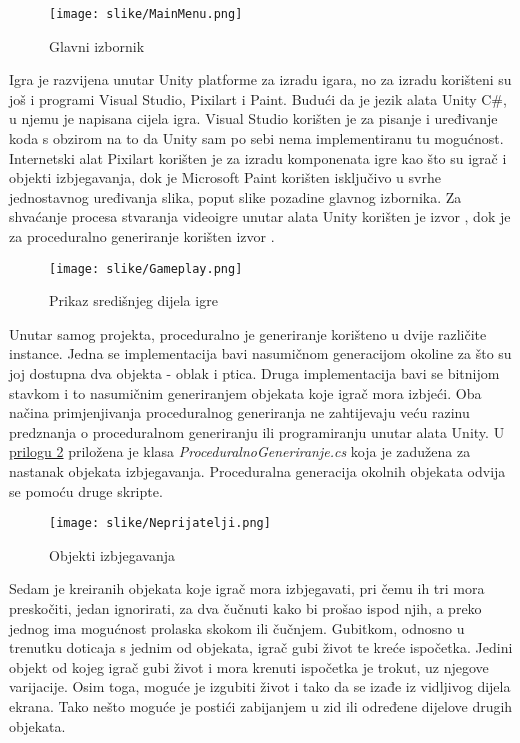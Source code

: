 \documentclass[]{foi} %
\begin{document}
\begin{figure}[H]
    \centering
    \texttt{[image: slike/MainMenu.png]}
    \caption{Glavni izbornik}
\end{figure}

Igra je razvijena unutar Unity platforme za izradu igara, no za izradu korišteni su još i programi Visual Studio, Pixilart i Paint. Budući da je jezik alata Unity C\#, u njemu je napisana cijela igra. Visual Studio korišten je za pisanje i uređivanje koda s obzirom na to da Unity sam po sebi nema implementiranu tu mogućnost. Internetski alat Pixilart korišten je za izradu komponenata igre kao što su igrač i objekti izbjegavanja, dok je Microsoft Paint korišten isključivo u svrhe jednostavnog uređivanja slika, poput slike pozadine glavnog izbornika. Za shvaćanje procesa stvaranja videoigre unutar alata Unity korišten je izvor \cite{youtube2dPlatformer}, dok je za proceduralno generiranje korišten izvor \cite{youtubeProceduralno}.

\begin{figure}[H]
    \centering
    \texttt{[image: slike/Gameplay.png]}
    \caption{Prikaz središnjeg dijela igre}
\end{figure}

Unutar samog projekta, proceduralno je generiranje korišteno u dvije različite instance. Jedna se implementacija bavi nasumičnom generacijom okoline za što su joj dostupna dva objekta - oblak i ptica. Druga implementacija bavi se bitnijom stavkom i to nasumičnim generiranjem objekata koje igrač mora izbjeći. Oba načina primjenjivanja proceduralnog generiranja ne zahtijevaju veću razinu predznanja o proceduralnom generiranju ili programiranju unutar alata Unity. U \hyperref[cha: prilog 2]{prilogu 2} priložena je klasa \textit{ProceduralnoGeneriranje.cs} koja je zadužena za nastanak objekata izbjegavanja. Proceduralna generacija okolnih objekata odvija se pomoću druge skripte.

\begin{figure}[H]
    \centering
    \texttt{[image: slike/Neprijatelji.png]}
    \caption{Objekti izbjegavanja}
\end{figure}

Sedam je kreiranih objekata koje igrač mora izbjegavati, pri čemu ih tri mora preskočiti, jedan ignorirati, za dva čučnuti kako bi prošao ispod njih, a preko jednog ima mogućnost prolaska skokom ili čučnjem. Gubitkom, odnosno u trenutku doticaja s jednim od objekata, igrač gubi život te kreće ispočetka. Jedini objekt od kojeg igrač gubi život i mora krenuti ispočetka je trokut, uz njegove varijacije. Osim toga, moguće je izgubiti život i tako da se izađe iz vidljivog dijela ekrana. Tako nešto moguće je postići zabijanjem u zid ili određene dijelove drugih objekata.
\end{document}
